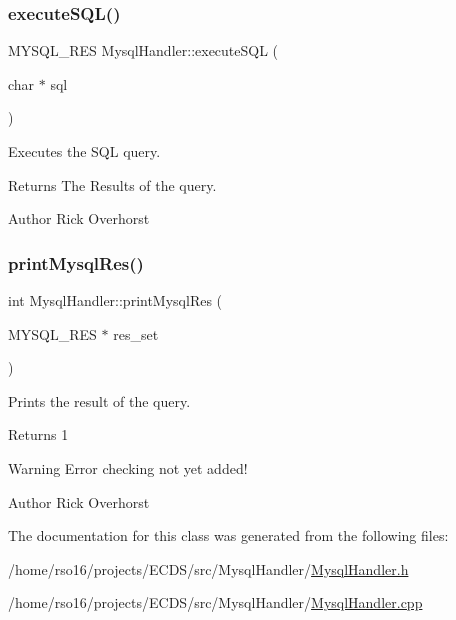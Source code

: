 \subsubsection{\texorpdfstring{execute\+S\+Q\+L()}{executeSQL()}}
{\footnotesize\ttfamily M\+Y\+S\+Q\+L\+\_\+\+R\+ES Mysql\+Handler\+::execute\+S\+QL (\begin{DoxyParamCaption}\item[{char $\ast$}]{sql }\end{DoxyParamCaption})}



Executes the S\+QL query. 

\begin{DoxyReturn}{Returns}
The Results of the query. 
\end{DoxyReturn}
\begin{DoxyAuthor}{Author}
Rick Overhorst 
\end{DoxyAuthor}
\mbox{\label{classMysqlHandler_affb80fba704894dca83d563f6582edc0}} 
\subsubsection{\texorpdfstring{print\+Mysql\+Res()}{printMysqlRes()}}
{\footnotesize\ttfamily int Mysql\+Handler\+::print\+Mysql\+Res (\begin{DoxyParamCaption}\item[{M\+Y\+S\+Q\+L\+\_\+\+R\+ES $\ast$}]{res\+\_\+set }\end{DoxyParamCaption})}



Prints the result of the query. 

\begin{DoxyReturn}{Returns}
1 
\end{DoxyReturn}
\begin{DoxyWarning}{Warning}
Error checking not yet added! 
\end{DoxyWarning}
\begin{DoxyAuthor}{Author}
Rick Overhorst 
\end{DoxyAuthor}


The documentation for this class was generated from the following files\+:\begin{DoxyCompactItemize}
\item 
/home/rso16/projects/\+E\+C\+D\+S/src/\+Mysql\+Handler/\hyperlink{MysqlHandler_8h}{Mysql\+Handler.\+h}\item 
/home/rso16/projects/\+E\+C\+D\+S/src/\+Mysql\+Handler/\hyperlink{MysqlHandler_8cpp}{Mysql\+Handler.\+cpp}\end{DoxyCompactItemize}
